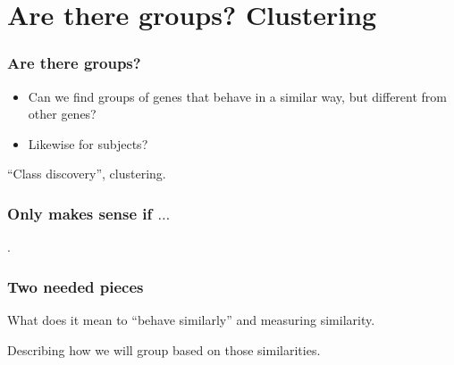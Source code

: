 

\section[Clustering]{Are there groups? Clustering}





\begin{frame}
\frametitle{Are there groups?}
\begin{itemize}
\item Can we find groups of genes that behave in a similar way, but
  different from other genes?
\item Likewise for subjects?
\end{itemize}

``Class discovery'', clustering.


\end{frame}


\begin{frame}
\frametitle{Only makes sense if $\ldots$}
.

\end{frame}




\begin{frame}
\frametitle{Two needed pieces}

What does it mean to ``behave similarly'' and measuring similarity.
\vspace*{20pt}

Describing how we will group based on those similarities.

\end{frame}



